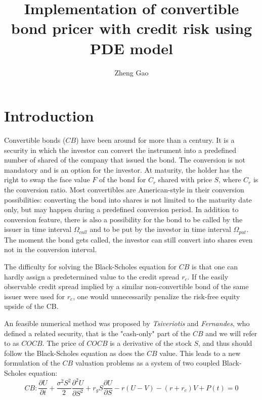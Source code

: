\documentclass[12pt]{article}
\begin{document}
\title{Implementation of convertible bond pricer with credit risk using PDE model}
\author{Zheng Gao}
\date{}
\maketitle

\section{Introduction\label{sec:intro}}
Convertible bonds ($CB$) have been around for more than a century. It is a security in which the investor can convert the instrument into a predefined number of shared of the company that issued the bond. The conversion is not mandatory and is an option for the investor. At maturity, the holder has the right to swap the face value $F$ of the bond for $C_r$ shared with price $S$, where $C_r$ is the conversion ratio. Most convertibles are American-style in their conversion possibilities: converting the bond into shares is not limited to the maturity date only, but may happen during a predefined conversion period. In addition to conversion feature, there is also a possibility for the bond to be called by the issuer in time interval $\Omega_{call}$ and to be put by the investor in time interval $\Omega_{put}$. The moment the bond gets called, the investor can still convert into shares even not in the conversion interval. 

The difficulty for solving the Black-Scholes equation for $CB$ is that one can hardly assign a predetermined value to the credit spread $r_c$. If the easily observable credit spread implied by a similar non-convertible bond of the same issuer were used for $r_c$, one would unnecessarily penalize the risk-free equity upside of the CB.

An feasible numerical method was proposed by \textit{Tsiveriotis} and \textit{Fernandes}, who defined a related security, that is the "cash-only" part of the $CB$ and we will refer to as $COCB$. The price of $COCB$ is a derivative of the stock $S$, and thus should follow the Black-Scholes equation as does the $CB$ value. This leads to a new formulation of the $CB$ valuation problems as a system of two coupled Black-Scholes equation:
\begin{equation}
CB: \frac{\partial{U}}{\partial{t}} + 
\frac{\sigma^2S^2}{2}\frac{\partial^2{U}}{\partial{S}^2} + r_gS\frac{\partial{U}}{\partial{S}} - r(U-V) - (r+r_c)V + P(t) = 0 
\label{eq:CB}
\end{equation}
\end{document}
